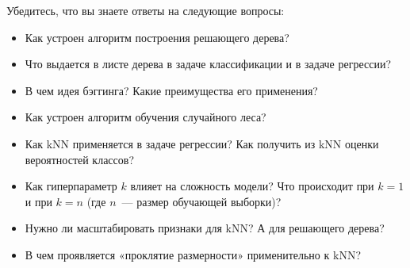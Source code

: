 \documentclass[12pt,a4paper]{article}
\begin{document}
Убедитесь, что вы знаете ответы на следующие вопросы:
\begin{itemize}
	\item Как устроен алгоритм построения решающего дерева?
	\item Что выдается в листе дерева в задаче классификации и в задаче регрессии?
	\item В чем идея бэггинга? Какие преимущества его применения?
	\item Как устроен алгоритм обучения случайного леса?
	\item Как kNN применяется в задаче регрессии? Как получить из kNN оценки вероятностей классов?
	\item Как гиперпараметр $k$ влияет на сложность модели? Что происходит при $k=1$ и при $k=n$ (где $n$~--- размер обучающей выборки)?
	\item Нужно ли масштабировать признаки для kNN? А для решающего дерева?
	\item В чем проявляется «проклятие размерности» применительно к kNN?
\end{itemize}
\end{document}
